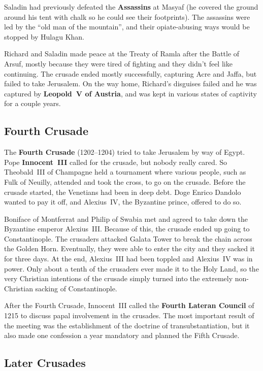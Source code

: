 Saladin had previously defeated the \textbf{Assassins} at Masyaf
(he covered the ground around his tent with chalk so he could see their footprints).
The assassins were led by the ``old man of the mountain'',
and their opiate-abusing ways would be stopped by Hulagu Khan.

Richard and Saladin made peace at the Treaty of Ramla after the Battle of Arsuf,
mostly because they were tired of fighting and they didn't feel like continuing.
The crusade ended mostly successfully, capturing Acre and Jaffa, but failed to take Jerusalem.
On the way home, Richard's disguises failed and he was captured by \textbf{Leopold~V of Austria},
and was kept in various states of captivity for a couple years.

\subsection*{Fourth Crusade}

The \textbf{Fourth Crusade} (1202--1204) tried to take Jerusalem by way of Egypt.
Pope \textbf{Innocent~III} called for the crusade, but nobody really cared.
So Theobald~III of Champagne held a tournament where various people, such as Fulk of Neuilly,
attended and took the cross, to go on the crusade.
Before the crusade started, the Venetians had been in deep debt.
Doge Enrico Dandolo wanted to pay it off, and Alexius~IV, the Byzantine prince, offered to do so.

Boniface of Montferrat and Philip of Swabia met and agreed to take down the Byzantine emperor Alexius~III\@.
Because of this, the crusade ended up going to Constantinople.
The crusaders attacked Galata Tower to break the chain across the Golden Horn.
Eventually, they were able to enter the city and they sacked it for three days.
At the end, Alexius~III had been toppled and Alexius~IV was in power.
Only about a tenth of the crusaders ever made it to the Holy Land,
so the very Christian intentions of the crusade simply turned into
the extremely non-Christian sacking of Constantinople.

After the Fourth Crusade,
Innocent~III called the \textbf{Fourth Lateran Council} of 1215 to discuss papal involvement in the crusades.
The most important result of the meeting was the establishment of the doctrine of transubstantiation,
but it also made one confession a year mandatory and planned the Fifth Crusade.

\subsection*{Later Crusades}

